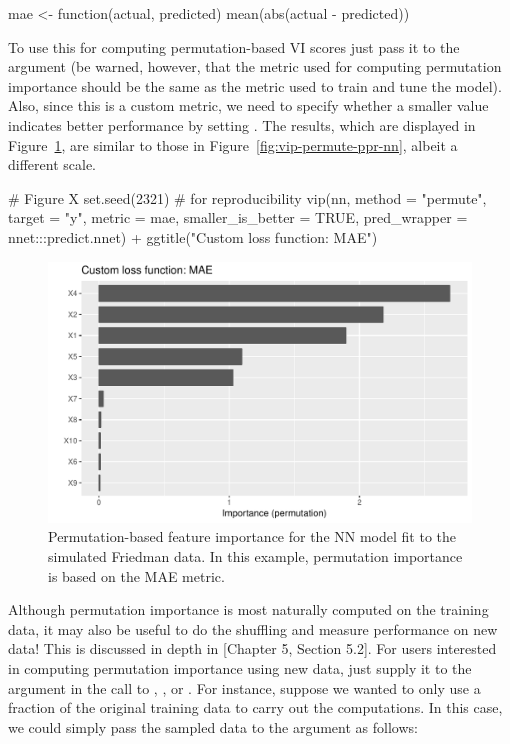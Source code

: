\begin{example}
mae <- function(actual, predicted) {
  mean(abs(actual - predicted))
}
\end{example}

To use this for computing permutation-based VI scores just pass it to the  argument (be warned, however, that the metric used for computing permutation importance should be the same as the metric used to train and tune the model). Also, since this is a custom metric, we need to specify whether a smaller value indicates better performance by setting . The results, which are displayed in Figure~\ref{fig:vip-nn-mae}, are similar to those in Figure~\ref{fig:vip-permute-ppr-nn}, albeit a different scale.

\begin{example}
# Figure X
set.seed(2321)  # for reproducibility
vip(nn, method = "permute", target = "y", metric = mae,
    smaller_is_better = TRUE, pred_wrapper = nnet:::predict.nnet) +
  ggtitle("Custom loss function: MAE")
\end{example}

\begin{figure}[!htb]
  \centering
  \includegraphics[width=1\linewidth]{figures/vip-permute-nn-mae}
  \caption{Permutation-based feature importance for the NN model fit to the simulated Friedman data. In this example, permutation importance is based on the MAE metric.}
  \label{fig:vip-nn-mae}
\end{figure}

Although permutation importance is most naturally computed on the training data, it may also be useful to do the shuffling and measure performance on new data! This is discussed in depth in \citet{molnar-2019-iml}[Chapter 5, Section 5.2]. For users interested in computing permutation importance using new data, just supply it to the  argument in the call to , , or . For instance, suppose we wanted to only use a fraction of the original training data to carry out the computations. In this case, we could simply pass the sampled data to the  argument as follows:

